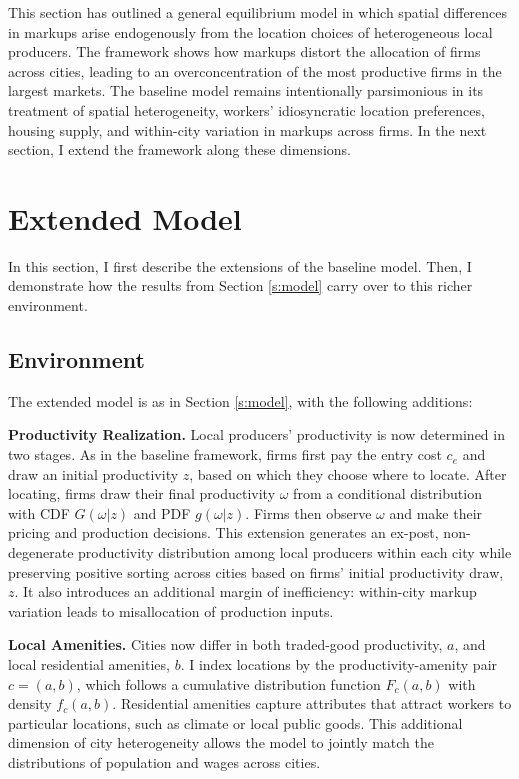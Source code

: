 This section has outlined a general equilibrium model in which spatial differences in markups arise endogenously from the location choices of heterogeneous local producers. The framework shows how markups distort the allocation of firms across cities, leading to an overconcentration of the most productive firms in the largest markets. The baseline model remains intentionally parsimonious in its treatment of spatial heterogeneity, workers’ idiosyncratic location preferences, housing supply, and within-city variation in markups across firms. In the next section, I extend the framework along these dimensions.

\section{Extended Model}\label{s:extmodel}
In this section, I first describe the extensions of the baseline model. Then, I demonstrate how the results from Section \ref{s:model} carry over to this richer environment.

\subsection{Environment}
The extended model is as in Section \ref{s:model}, with the following additions:

\textbf{Productivity Realization.} Local producers’ productivity is now determined in two stages. As in the baseline framework, firms first pay the entry cost $c_e$ and draw an initial productivity $z$, based on which they choose where to locate. After locating, firms draw their final productivity $\omega$ from a conditional distribution with CDF $G(\omega | z)$ and PDF $g(\omega | z)$. Firms then observe $\omega$ and make their pricing and production decisions. This extension generates an ex-post, non-degenerate productivity distribution among local producers within each city while preserving positive sorting across cities based on firms’ initial productivity draw, $z$. It also introduces an additional margin of inefficiency: within-city markup variation leads to misallocation of production inputs.

\textbf{Local Amenities.} Cities now differ in both traded-good productivity, $a$, and local residential amenities, $b$. I index locations by the productivity-amenity pair $c=(a,b)$, which follows a cumulative distribution function $F_c(a,b)$ with density $f_c(a,b)$. Residential amenities capture attributes that attract workers to particular locations, such as climate or local public goods. This additional dimension of city heterogeneity allows the model to jointly match the distributions of population and wages across cities.

